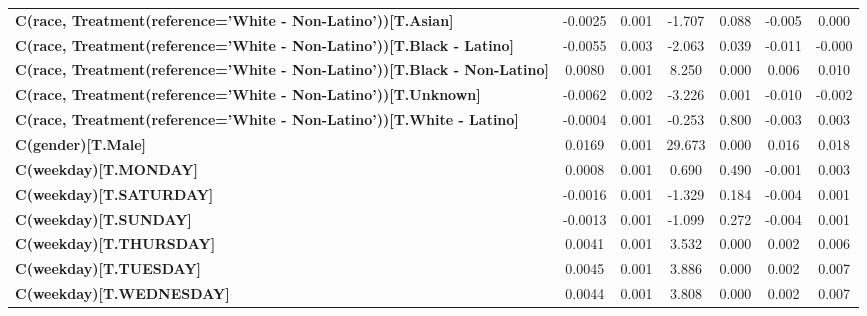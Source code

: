 \begin{center}
\begin{tabular}{lcccccc}
\textbf{C(race, Treatment(reference='White - Non-Latino'))[T.Asian]}              &      -0.0025  &        0.001     &    -1.707  &         0.088        &       -0.005    &        0.000     \\
\textbf{C(race, Treatment(reference='White - Non-Latino'))[T.Black - Latino]}     &      -0.0055  &        0.003     &    -2.063  &         0.039        &       -0.011    &       -0.000     \\
\textbf{C(race, Treatment(reference='White - Non-Latino'))[T.Black - Non-Latino]} &       0.0080  &        0.001     &     8.250  &         0.000        &        0.006    &        0.010     \\
\textbf{C(race, Treatment(reference='White - Non-Latino'))[T.Unknown]}            &      -0.0062  &        0.002     &    -3.226  &         0.001        &       -0.010    &       -0.002     \\
\textbf{C(race, Treatment(reference='White - Non-Latino'))[T.White - Latino]}     &      -0.0004  &        0.001     &    -0.253  &         0.800        &       -0.003    &        0.003     \\
\textbf{C(gender)[T.Male]}                                                        &       0.0169  &        0.001     &    29.673  &         0.000        &        0.016    &        0.018     \\
\textbf{C(weekday)[T.MONDAY]}                                                     &       0.0008  &        0.001     &     0.690  &         0.490        &       -0.001    &        0.003     \\
\textbf{C(weekday)[T.SATURDAY]}                                                   &      -0.0016  &        0.001     &    -1.329  &         0.184        &       -0.004    &        0.001     \\
\textbf{C(weekday)[T.SUNDAY]}                                                     &      -0.0013  &        0.001     &    -1.099  &         0.272        &       -0.004    &        0.001     \\
\textbf{C(weekday)[T.THURSDAY]}                                                   &       0.0041  &        0.001     &     3.532  &         0.000        &        0.002    &        0.006     \\
\textbf{C(weekday)[T.TUESDAY]}                                                    &       0.0045  &        0.001     &     3.886  &         0.000        &        0.002    &        0.007     \\
\textbf{C(weekday)[T.WEDNESDAY]}                                                  &       0.0044  &        0.001     &     3.808  &         0.000        &        0.002    &        0.007     \\

\end{tabular}
\end{center}
